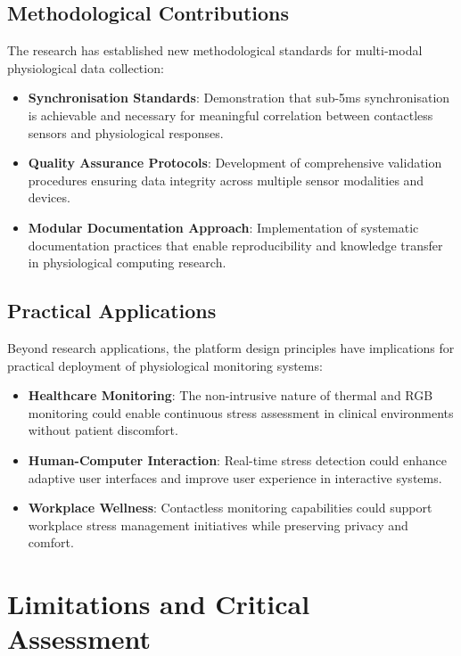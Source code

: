 \subsection{Methodological Contributions}

The research has established new methodological standards for multi-modal physiological data collection:

\begin{itemize}
\item \textbf{Synchronisation Standards}: Demonstration that sub-5ms synchronisation is achievable and necessary for meaningful correlation between contactless sensors and physiological responses.

\item \textbf{Quality Assurance Protocols}: Development of comprehensive validation procedures ensuring data integrity across multiple sensor modalities and devices.

\item \textbf{Modular Documentation Approach}: Implementation of systematic documentation practices that enable reproducibility and knowledge transfer in physiological computing research.
\end{itemize}

\subsection{Practical Applications}

Beyond research applications, the platform design principles have implications for practical deployment of physiological monitoring systems:

\begin{itemize}
\item \textbf{Healthcare Monitoring}: The non-intrusive nature of thermal and RGB monitoring could enable continuous stress assessment in clinical environments without patient discomfort.

\item \textbf{Human-Computer Interaction}: Real-time stress detection could enhance adaptive user interfaces and improve user experience in interactive systems.

\item \textbf{Workplace Wellness}: Contactless monitoring capabilities could support workplace stress management initiatives while preserving privacy and comfort.
\end{itemize}

\section{Limitations and Critical Assessment}

